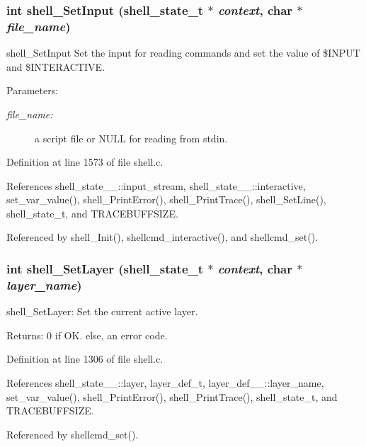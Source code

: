 \subsubsection{\setlength{\rightskip}{0pt plus 5cm}int shell\_\-Set\-Input ({\bf shell\_\-state\_\-t} $\ast$ {\em context}, char $\ast$ {\em file\_\-name})}\label{shell_8c_a37}


shell\_\-Set\-Input Set the input for reading commands and set the value of \$INPUT and \$INTERACTIVE.

\begin{Desc}
\item[Parameters:]
\begin{description}
\item[{\em file\_\-name:}]a script file or NULL for reading from stdin. \end{description}
\end{Desc}


Definition at line 1573 of file shell.c.

References shell\_\-state\_\-\_\-::input\_\-stream, shell\_\-state\_\-\_\-::interactive, set\_\-var\_\-value(), shell\_\-Print\-Error(), shell\_\-Print\-Trace(), shell\_\-Set\-Line(), shell\_\-state\_\-t, and TRACEBUFFSIZE.

Referenced by shell\_\-Init(), shellcmd\_\-interactive(), and shellcmd\_\-set().
\subsubsection{\setlength{\rightskip}{0pt plus 5cm}int shell\_\-Set\-Layer ({\bf shell\_\-state\_\-t} $\ast$ {\em context}, char $\ast$ {\em layer\_\-name})}\label{shell_8c_a29}


shell\_\-Set\-Layer: Set the current active layer. \begin{Desc}
\item[Returns:]0 if OK. else, an error code. \end{Desc}


Definition at line 1306 of file shell.c.

References shell\_\-state\_\-\_\-::layer, layer\_\-def\_\-t, layer\_\-def\_\-\_\-::layer\_\-name, set\_\-var\_\-value(), shell\_\-Print\-Error(), shell\_\-Print\-Trace(), shell\_\-state\_\-t, and TRACEBUFFSIZE.

Referenced by shellcmd\_\-set().
